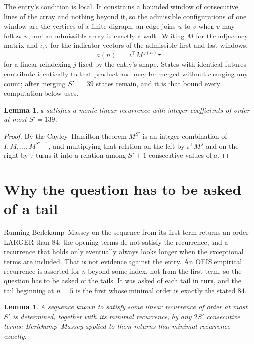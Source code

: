 \documentclass[11pt,a4paper]{article}
\theoremstyle{plain}
\newtheorem{lemma}[theorem]{Lemma}
\theoremstyle{definition}
\begin{document}
The entry's condition is local. It constrains a bounded window of consecutive lines of the
array and nothing beyond it, so the admissible configurations of one window are the vertices of
a finite digraph, an edge joins $u$ to $v$ when $v$ may follow $u$, and an admissible array is
exactly a walk. Writing $M$ for the adjacency matrix and $\iota,\tau$ for the indicator vectors
of the admissible first and last windows,
\[
a(n)\;=\;\iota^{\!\top}M^{\,j(n)}\tau
\]
for a linear reindexing $j$ fixed by the entry's shape. States with identical futures
contribute identically to that product and may be merged without changing any count; after
merging $S'=139$ states remain, and it is that bound every computation below uses.

\begin{lemma}\label{lem:cf}
$a$ satisfies a monic linear recurrence with integer coefficients of order at most $S'=139$.
\end{lemma}

\begin{proof}
By the Cayley--Hamilton theorem $M^{S'}$ is an integer combination of $I,M,\dots,M^{S'-1}$,
and multiplying that relation on the left by $\iota^{\!\top}M^{\,j}$ and on the right by
$\tau$ turns it into a relation among $S'+1$ consecutive values of $a$.
\end{proof}

\section{Why the question has to be asked of a tail}

Running Berlekamp--Massey on the sequence from its first term returns an order LARGER than $84$: the opening terms do not satisfy the recurrence, and a recurrence that holds only eventually always looks longer when the exceptional terms are included. That is not evidence against the entry. An OEIS empirical recurrence is asserted for $n$ beyond some index, not from the first term, so the question has to be asked of the tails. It was asked of each tail in turn, and the tail beginning at $n=5$ is the first whose minimal order is exactly the stated $84$.

\begin{lemma}\label{lem:bm}
A sequence known to satisfy some linear recurrence of order at most $S'$ is determined,
together with its minimal recurrence, by any $2S'$ consecutive terms: Berlekamp--Massey applied
to them returns that minimal recurrence exactly.
\end{lemma}
\end{document}

